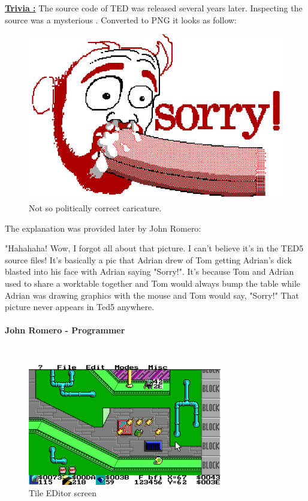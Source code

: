 \documentclass[book.tex]{subfiles}
\begin{document}
 \textbf{\underline{Trivia :}} The source code of TED was released several years later. Inspecting the source was a mysterious . Converted to PNG it looks as follow:\\
\begin{figure}[H]
\centering
 \includegraphics[width=\textwidth]{imgs/_tom.eps}
 \caption{Not so politically correct caricature.} \label{fig:mips}
 \end{figure}
The explanation was provided later by John Romero:\\
 \begin{fancyquotes}
   "Hahahaha! Wow, I forgot all about that picture. I can't believe it's 
in the TED5 source files! It's basically a pic that Adrian drew of Tom 
getting Adrian's dick blasted into his face with Adrian saying "Sorry!". 
It's because Tom and Adrian used to share a worktable together and Tom 
would always bump the table while Adrian was drawing graphics with the 
mouse and Tom would say, "Sorry!" That picture never appears in Ted5 
anywhere.\\
   \\
\textbf{John Romero - Programmer}
 \end{fancyquotes}\\

 \begin{figure}[H]
\centering
 \includegraphics[width=\textwidth]{imgs/ted5_scrolling_map.png}
 \caption{Tile EDitor screen} \label{fig:mips}
 \end{figure}
\end{document}
